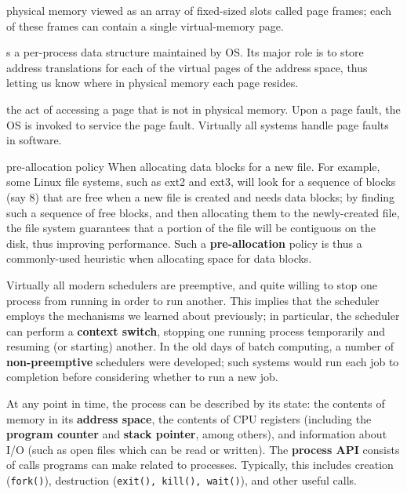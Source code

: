 \begin{description}
\item[page frame] physical memory viewed as an array of fixed-sized slots called page frames; each of these frames can contain a single virtual-memory page.

\item[page table] s a per-process data structure maintained by OS.  Its major role is to store address translations for each of the virtual pages of the address space, thus letting us know where in physical memory each page resides.

\item[page fault] the act of accessing a page that is not in physical memory.  Upon a page fault, the OS is invoked to service the page fault.  Virtually all systems handle page faults in software.

\item{pre-allocation policy} When allocating data blocks for a new file. For example, some Linux file systems, such as ext2 and ext3, will look for a sequence of blocks (say 8) that are free when a new file is created and needs data blocks; by finding such a sequence of free blocks, and then allocating them to the newly-created file, the file system guarantees that a portion of the file will be contiguous on the disk, thus improving performance. Such a \textbf{pre-allocation} policy is thus a commonly-used heuristic when allocating space for data blocks.

\item[preemptive scheduling] Virtually all modern schedulers are preemptive, and quite willing to stop one process from running in order to run another. This implies that the scheduler employs the mechanisms we learned about previously; in particular, the scheduler can perform a \textbf{context switch}, stopping one running process temporarily and resuming (or starting) another. In the old days of batch computing, a number of \textbf{non-preemptive} schedulers were developed; such systems would run each job to completion before considering whether to run a new job.

\item[process] At any point in time, the process can be described by its state: the contents of memory in its \textbf{address space}, the contents of CPU registers (including the \textbf{program counter} and \textbf{stack pointer}, among others), and information about I/O (such as open files which can be read or written). The \textbf{process API} consists of calls programs can make related to processes. Typically, this includes creation (\texttt{fork()}), destruction (\texttt{exit(), kill(), wait()}), and other useful calls.


\end{description}
